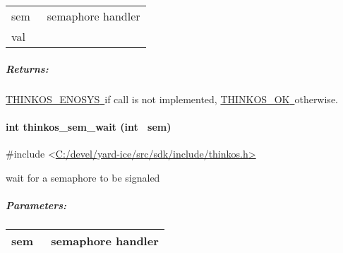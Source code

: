 {\protect\hypertarget{t.4fd8384b48c431f3cad5f382b558ebd8eed50495}{}{}\protect\hypertarget{t.21}{}{}

\begin{longtable}[]{@{}ll@{}}
\toprule
\begin{minipage}[t]{0.47\columnwidth}\raggedright\strut
{sem}{~}\strut
\end{minipage} & \begin{minipage}[t]{0.47\columnwidth}\raggedright\strut
{semaphore handler }\strut
\end{minipage}\tabularnewline
\begin{minipage}[t]{0.47\columnwidth}\raggedright\strut
{val}{~}\strut
\end{minipage} & \begin{minipage}[t]{0.47\columnwidth}\raggedright\strut
{}\strut
\end{minipage}\tabularnewline
\bottomrule
\end{longtable}

\subparagraph{\texorpdfstring{{Returns:}}{Returns:}}\label{returns-25}

{\protect\hyperlink{h.3s49zyc}{THINKOS\_ENOSYS}}{\protect\hyperlink{h.3s49zyc}{~}}{if
call is not implemented,
}{\protect\hyperlink{h.2fk6b3p}{THINKOS\_OK}}{\protect\hyperlink{h.2fk6b3p}{~}}{otherwise.
}

\paragraph{\texorpdfstring{{int thinkos\_sem\_wait (int
~sem)}}{int thinkos\_sem\_wait (int ~sem)}}\label{int-thinkos_sem_wait-int-sem}

{}

{\#include
\textless{}}{\protect\hyperlink{h.pkwqa1}{C:/devel/yard-ice/src/sdk/include/thinkos.h}}{\protect\hyperlink{h.pkwqa1}{\textgreater{}}}

{wait for a semaphore to be signaled }

{}

\subparagraph{\texorpdfstring{{Parameters:}}{Parameters:}}\label{parameters-22}

\protect\hypertarget{t.42f0ad63e27678006eae2b4c683934157041a4d7}{}{}\protect\hypertarget{t.22}{}{}

\begin{longtable}[]{@{}ll@{}}
\toprule
\begin{minipage}[t]{0.47\columnwidth}\raggedright\strut
{sem}{~}\strut
\end{minipage} & \begin{minipage}[t]{0.47\columnwidth}\raggedright\strut
{semaphore handler }\strut
\end{minipage}\tabularnewline
\bottomrule
\end{longtable}

}
